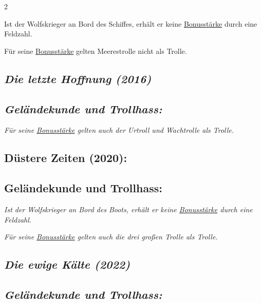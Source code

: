 \documentclass[10pt, a4paper, oneside]{book}
\newcommand{\fan}[1]{\textit{#1}}
\begin{document}
\begin{multicols*}{2}
\begin{bgcolor}
Ist der Wolfskrieger an Bord des Schiffes, erhält er keine \hyperref[Bonusstärke]{Bonusstärke} durch eine Feldzahl.

Für seine \hyperref[Bonusstärke]{Bonusstärke} gelten Meerestrolle nicht als Trolle.
\supercite{10469}

\end{bgcolor}


\begin{bgcolor}
\section{\fan{Die letzte Hoffnung (2016)}}

\subsection{\fan{Geländekunde und Trollhass:}}

\fan{Für seine \hyperref[Bonusstärke]{Bonusstärke} gelten auch der Urtroll und Wachtrolle als Trolle.}

\end{bgcolor}



\begin{bgcolor}[color-DZ]
\section{Düstere Zeiten (2020):}

\subsection{Geländekunde und Trollhass:}


\fan{Ist der Wolfskrieger an Bord des Boots, erhält er keine \hyperref[Bonusstärke]{Bonusstärke} durch eine Feldzahl.}

\fan{Für seine \hyperref[Bonusstärke]{Bonusstärke} gelten auch die drei großen Trolle als Trolle.}

\end{bgcolor}



\begin{bgcolor}
\section{\fan{Die ewige Kälte (2022)}}

\subsection{\fan{Geländekunde und Trollhass:}}


\end{bgcolor}
\end{multicols*}
\end{document}
